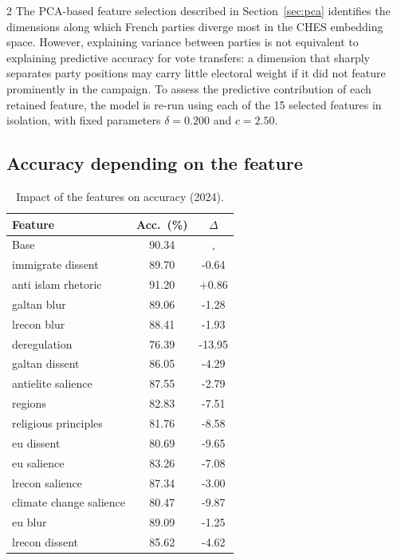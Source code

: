 \documentclass[10pt, a4paper]{article}
\begin{document}
\begin{multicols}{2}
The PCA-based feature selection described in Section~\ref{sec:pca} identifies
the dimensions along which French parties diverge most in the CHES embedding
space. However, explaining variance between parties is not equivalent to
explaining predictive accuracy for vote transfers: a dimension that sharply
separates party positions may carry little electoral weight if it did not
feature prominently in the campaign. To assess the predictive contribution
of each retained feature, the model is re-run using each of the 15 selected
features in isolation, with fixed parameters $\delta = 0.200$ and $c = 2.50$.

\subsection{Accuracy depending on the feature}


\begin{table}[H]
\centering
\caption{Impact of the features on accuracy (2024).}
\label{tab:impact_features_accuracy}
\small
\begin{tabular}{lcc}
\toprule
\textbf{Feature} & \textbf{Acc.\ (\%)} & \textbf{$\Delta$} \\
\midrule
Base  & 90.34 & , \\
immigrate dissent & 89.70 & -0.64 \\
anti islam rhetoric & 91.20 & +0.86 \\
galtan blur & 89.06 & -1.28 \\
lrecon blur & 88.41 & -1.93 \\
deregulation & 76.39 & -13.95 \\
galtan dissent & 86.05 & -4.29 \\
antielite salience & 87.55 & -2.79 \\
regions & 82.83 & -7.51 \\
religious principles & 81.76 & -8.58 \\
eu dissent & 80.69 & -9.65 \\
eu salience & 83.26 & -7.08 \\
lrecon salience & 87.34 & -3.00 \\
climate change salience & 80.47 & -9.87 \\
eu blur & 89.09 & -1.25 \\
lrecon dissent & 85.62 & -4.62 \\

\bottomrule
\end{tabular}
\end{table}


\end{multicols}
\end{document}
